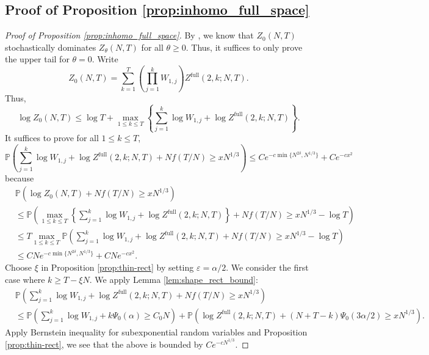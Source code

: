 \documentclass[11pt]{article}
\theoremstyle{definition}
\newcommand{\Prob}{\mathbb{P}}
\newcommand{\Zfull}{Z^{\mathrm{full}}}
\begin{document}
\subsection{Proof of Proposition \ref{prop:inhomo_full_space}}
\begin{proof}[Proof of Proposition \ref{prop:inhomo_full_space}]
By \cite[Lemma 13.1]{stat}, we know that $Z_0(N,T)$ stochastically dominates $Z_\theta(N,T)$ for all $\theta \geq 0$. Thus, it suffices to only prove the upper tail for $\theta=0$. Write 
\[
Z_0(N,T) = \sum_{k=1}^{T} \left( \prod_{j=1}^k W_{1,j} \right)\Zfull(2,k;N,T).
\]
Thus,
\[
\log Z_0(N,T) \leq \log T + \max_{1 \leq k\leq T}\left\{  \sum_{j=1}^k \log W_{1,j}+ \log\Zfull(2,k;N,T)\right\}.
\]
It suffices to prove for all $1 \leq k \leq T$,
\[
\Prob\left(\sum_{j=1}^k \log W_{1,j}+ \log\Zfull(2,k;N,T) + Nf(T/N) \geq xN^{1/3}\right) \leq Ce^{-c \min \{N^{2\delta}, N^{1/3}\}} + Ce^{-cx^2}
\]
because
\[
\begin{aligned}
    &\Prob\left(\log Z_0(N,T) + Nf\left(T/N\right) \geq xN^{1/3}\right) \\
    &\leq \Prob\left( \max_{1 \leq k\leq T}\left\{  \sum_{j=1}^k \log W_{1,j}+ \log\Zfull(2,k;N,T)\right\} + Nf\left(T/N\right) \geq xN^{1/3} - \log T\right)\\
    &\leq T \max_{1 \leq k\leq T}\Prob\left(\sum_{j=1}^k \log W_{1,j}+ \log\Zfull(2,k;N,T) + Nf\left(T/N\right) \geq xN^{1/3} - \log T\right)\\
    &\leq CNe^{-c \min \{N^{2\delta}, N^{1/3}\}} + CNe^{-cx^2}.
\end{aligned}
\]
Choose $\xi$ in Proposition \ref{prop:thin-rect} by setting $\varepsilon = \alpha/2$. We consider the first case where $k \geq T-\xi N$. We apply Lemma \ref{lem:shape_rect_bound}:
\[
\begin{aligned}
&\Prob\left(\sum_{j=1}^k \log W_{1,j}+ \log\Zfull(2,k;N,T) + Nf(T/N) \geq xN^{1/3}\right)\\
&\leq \Prob\left(\sum_{j=1}^k \log W_{1,j}+ k\Psi_0(\alpha) \geq C_0N\right) + \Prob \left(\log\Zfull(2,k;N,T) + (N+T-k)\Psi_0(3\alpha/2) \geq xN^{1/3}\right).
\end{aligned}
\]
Apply Bernstein inequality for subexponential random variables \cite[Theorem 2.9.1]{Vershynin_2018} and Proposition \ref{prop:thin-rect}, we see that the above is bounded by $Ce^{-cN^{1/3}}$.


\end{proof}
\end{document}
